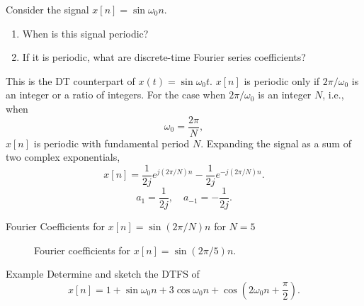\begin{frame}
    \begin{example}
        Consider the signal $x[n] = \sin \omega_0 n$.
        \begin{enumerate}
            \item When is this signal periodic?
            \item If it is periodic, what are discrete-time Fourier series coefficients?
        \end{enumerate}
    \end{example}
    \pause
    {
        This is the DT counterpart of $x(t) = \sin \omega_0 t$. $x[n]$ is periodic only if $2\pi/\omega_0$ is an integer or a ratio of integers. For the case when $2\pi/\omega_0$ is an integer $N$, i.e., when
        \begin{equation*}
            \omega_0 = \frac{2\pi}{N},
        \end{equation*}
        $x[n]$ is periodic with fundamental period $N$.
    }
    \pause
    {
        Expanding the signal as a sum of two complex exponentials,
        \begin{equation}
            x[n] = \frac{1}{2j}e^{j(2\pi/N)n} - \frac{1}{2j}e^{-j(2\pi/N)n}.
        \end{equation}
        \pause
        \begin{equation*}
            a_1 = \frac{1}{2j}, \quad a_{-1} = -\frac{1}{2j}.
        \end{equation*}
    }

\end{frame}

\begin{frame}{Fourier Coefficients for $x[n] = \sin(2\pi/N)n$ for $N=5$ }
    \begin{figure}
        \centering
        
        \caption{Fourier coefficients for $x[n] = \sin(2\pi/5)n$.}
    \end{figure}
\end{frame}

\begin{frame}{Example}
    Determine and sketch the DTFS of
    \begin{equation*}
        x[n] = 1 + \sin \omega_0 n + 3 \cos \omega_0 n + \cos\left(2\omega_0 n + \frac{\pi}{2}\right).
    \end{equation*}
    \pause
\end{frame}

\begin{frame}
    \begin{figure}
        \centering
        
    \end{figure}
\end{frame}

